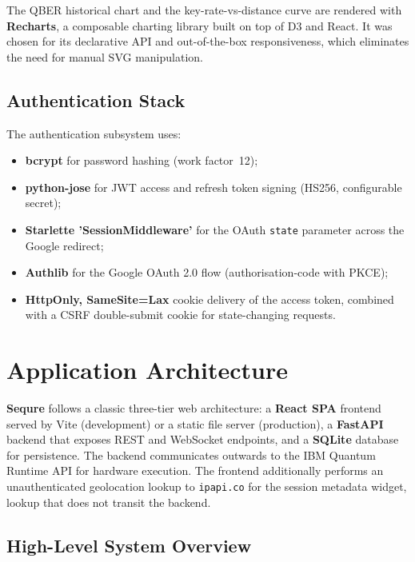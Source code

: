 \documentclass[12pt, a4paper]{article}
\begin{document}
The QBER historical chart and the key-rate-vs-distance curve are rendered
with \textbf{Recharts}, a composable charting library built on top of
D3 and React. It was chosen for its declarative API and out-of-the-box
responsiveness, which eliminates the need for manual SVG manipulation.

\subsection{Authentication Stack}
\label{sec:auth-stack}

The authentication subsystem uses:
\begin{itemize}
  \item \textbf{bcrypt} for password hashing (work factor~12);
  \item \textbf{python-jose} for JWT access and refresh token signing
        (HS256, configurable secret);
  \item \textbf{Starlette 'SessionMiddleware'} for the OAuth
        \texttt{state} parameter across the Google redirect;
  \item \textbf{Authlib} for the Google OAuth 2.0 flow
        (authorisation-code with PKCE);
  \item \textbf{HttpOnly, SameSite=Lax} cookie delivery of the
        access token, combined with a CSRF double-submit cookie for
        state-changing requests.
\end{itemize}

\newpage
\section{Application Architecture}
\label{sec:architecture}

\textbf{Sequre} follows a classic three-tier web architecture: a \textbf{React SPA}
frontend served by Vite (development) or a static file server (production),
a \textbf{FastAPI} backend that exposes REST and WebSocket endpoints, and a
\textbf{SQLite} database for persistence. The backend communicates outwards to the IBM Quantum Runtime API for hardware execution. The frontend additionally performs an unauthenticated geolocation lookup to \texttt{ipapi.co} for the session metadata widget, lookup that does not transit the backend.

\subsection{High-Level System Overview}
\label{sec:system-overview}
\end{document}
